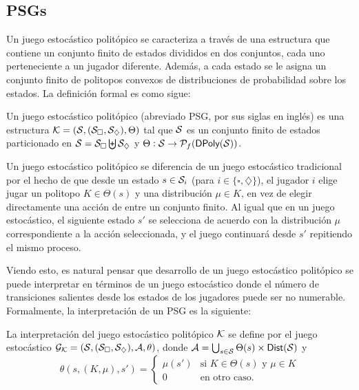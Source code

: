 \subsection*{PSGs}


Un juego estocástico politópico se caracteriza a través de una estructura que
contiene un conjunto finito de estados divididos en dos conjuntos, cada uno
perteneciente a un jugador diferente. Además, a cada estado se le asigna un
conjunto finito de politopos convexos de distribuciones de probabilidad sobre
los estados. La definición formal es como sigue:

\begin{definition}[PSG]
	Un juego estocástico politópico (abreviado PSG, por sus siglas en inglés) es una estructura \( \mathcal{K} = (\mathcal{S}, (\mathcal{S}_\square, \mathcal{S}_\diamondsuit), \Theta) \) tal que \( \mathcal{S} \) es un conjunto finito de estados particionado en \( \mathcal{S} = \mathcal{S}_\square \biguplus \mathcal{S}_\diamondsuit \) y \( \Theta : \mathcal{S} \to \mathcal{P}_f(\textsf{DPoly}(\mathcal{S})) \).
\end{definition}

Un juego estocástico politópico se diferencia de un juego estocástico
tradicional por el hecho de que desde un estado \( s \in \mathcal{S}_i \) (para \( i
\in \{ \square, \diamondsuit \} \)), el jugador \( i \) elige jugar un politopo
\( K \in \Theta(s) \) y una distribución \( \mu \in K \), en vez de elegir
directamente una acción de entre un conjunto finito. Al igual que en un juego
estocástico, el siguiente estado \( s' \) se selecciona de acuerdo con la
distribución \( \mu \) correspondiente a la acción seleccionada, y el juego
continuará desde \( s' \) repitiendo el mismo proceso.

Viendo esto, es natural pensar que desarrollo de un juego estocástico
politópico se puede interpretar en términos de un juego estocástico donde el
número de transiciones salientes desde los estados de los jugadores puede ser
no numerable. Formalmente, la interpretación de un PSG es la siguiente:

\begin{definition}
	La interpretación del juego estocástico politópico \( \mathcal{K} \) se define por el juego estocástico \( \mathcal{G}_{\mathcal{K}} = (\mathcal{S}, (\mathcal{S}_\square, \mathcal{S}_\diamondsuit), \mathcal{A}, \theta) \), donde \( \mathcal{A} = \bigcup_{s \in \mathcal{S}} \Theta(s) \times \textsf{Dist}(\mathcal{S}) \) y
	\[
		\theta(s, (K, \mu), s') =
		\begin{cases}
			\mu(s') & \text{si } K \in \Theta(s) \text{ y } \mu \in K \\
			0 & \text{en otro caso}.
		\end{cases}
	\]
\end{definition}


